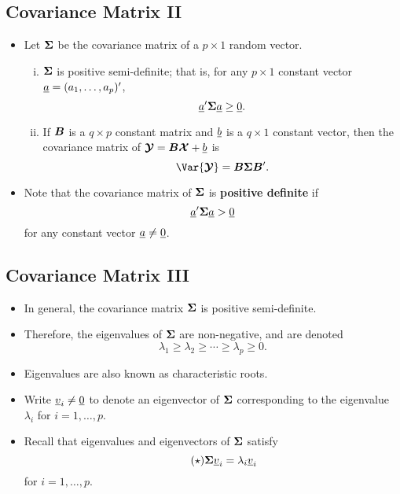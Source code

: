 \subsection*{Covariance Matrix II}
\begin{itemize}
      \item Let $ \bm{\Sigma} $ be the covariance matrix of a $ p\times 1 $ random vector.
            \begin{enumerate}[(i)]
                  \item $ \bm{\Sigma} $ is positive semi-definite; that is, for any $ p\times 1 $ constant vector
                        $ \underline{a}=(a_1,\ldots,a_p)' $,
                        \[ \underline{a}'\bm{\Sigma}\underline{a}\ge \underline{0}. \]
                  \item If $ \bm{B} $ is a $ q\times p $ constant matrix and $ \underline{b} $ is a $ q\times 1 $ constant vector, then
                        the covariance matrix of $ \bm{\mathcal{Y}}=\bm{B}\bm{\mathcal{X}}+\underline{b} $ is
                        \[ \Var{\RMatrix{Y}}=\Matrix{B}\Matrix{\Sigma}\Matrix{B}'. \]
            \end{enumerate}
      \item Note that the covariance matrix of $ \bm{\Sigma} $ is \textbf{positive definite} if
            \[ \underline{a}'\bm{\Sigma}\underline{a}>\underline{0} \]
            for any constant vector $ \underline{a}\ne \underline{0} $.
\end{itemize}
\subsection*{Covariance Matrix III}
\begin{itemize}
      \item In general, the covariance matrix $ \bm{\Sigma} $ is positive semi-definite.
      \item Therefore, the eigenvalues of $ \bm{\Sigma} $ are non-negative, and are denoted
            \[ \lambda_1\ge \lambda_2\ge \cdots \ge \lambda_p\ge 0. \]
      \item Eigenvalues are also known as characteristic roots.
      \item Write $ \underline{v}_i\ne \underline{0} $ to denote an eigenvector of $ \bm{\Sigma} $ corresponding to the eigenvalue
            $ \lambda_i $ for $ i=1,\ldots,p $.
      \item Recall that eigenvalues and eigenvectors of $ \bm{\Sigma} $ satisfy
            \begin{equation}\tag*{($\star$)}\label{L1Star1}
                  \bm{\Sigma}\underline{v}_i=\lambda_i \underline{v}_i
            \end{equation}
            for $ i=1,\ldots,p $.
\end{itemize}
